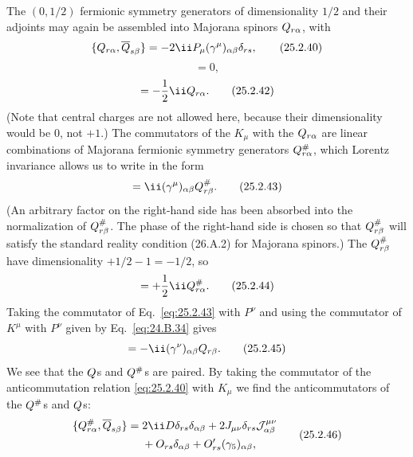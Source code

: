 The \((0,1/2)\) fermionic symmetry generators of dimensionality \(1/2\)
and their adjoints may again be assembled into Majorana spinors
\(Q_{r\alpha}\), with
\begin{equation}
\{\MajoranaQ_{r\alpha},\overline{\MajoranaQ}_{s\beta}\}
=-2\ii P_\mu(\gamma^\mu)_{\alpha\beta}\delta_{rs},
\tag{25.2.40}\label{eq:25.2.40}
\end{equation}
\begin{equation}
[P_\mu,\MajoranaQ_{r\alpha}]=0,
\tag{25.2.41}\label{eq:25.2.41}
\end{equation}
\begin{equation}
[D,\MajoranaQ_{r\alpha}]
=-\frac12\ii\MajoranaQ_{r\alpha}.
\tag{25.2.42}\label{eq:25.2.42}
\end{equation}
(Note that central charges are not allowed here, because their
dimensionality would be 0, not \(+1\).) The commutators of the \(K_\mu\)
with the \(Q_{r\alpha}\) are linear combinations of Majorana
fermionic symmetry generators \(Q^\#_{r\alpha}\), which Lorentz
invariance allows us to write in the form
\begin{equation}
[K^\mu,\MajoranaQ_{r\alpha}]
=\ii(\gamma^\mu)_{\alpha\beta}\MajoranaQ^\#_{r\beta}.
\tag{25.2.43}\label{eq:25.2.43}
\end{equation}
(An arbitrary factor on the right-hand side has been absorbed into the
normalization of \(Q^\#_{r\beta}\). The phase of the right-hand
side is chosen so that \(Q^\#_{r\beta}\) will satisfy the standard
reality condition (26.A.2) for Majorana spinors.) The
\(Q^\#_{r\beta}\) have dimensionality \(+1/2-1=-1/2\), so
\begin{equation}
[D,\MajoranaQ^\#_{r\alpha}]
=+\frac12\ii\MajoranaQ^\#_{r\alpha}.
\tag{25.2.44}\label{eq:25.2.44}
\end{equation}
Taking the commutator of Eq.~\eqref{eq:25.2.43} with \(P^\nu\) and using
the commutator of \(K^\mu\) with \(P^\nu\) given by
Eq.~\eqref{eq:24.B.34} gives
\begin{equation}
[P^\nu,\MajoranaQ^\#_{r\alpha}]
=-\ii(\gamma^\nu)_{\alpha\beta}\MajoranaQ_{r\beta}.
\tag{25.2.45}\label{eq:25.2.45}
\end{equation}
We see that the \(Q\)s and \(Q^\#\)s are paired. By
taking the commutator of the anticommutation relation \eqref{eq:25.2.40}
with \(K_\mu\) we find the anticommutators of the
\(Q^\#\)s and \(Q\)s:
\begin{equation}
\begin{aligned}
\{\MajoranaQ^\#_{r\alpha},\overline{\MajoranaQ}_{s\beta}\}
={}&2\ii D\delta_{rs}\delta_{\alpha\beta}
+2J_{\mu\nu}\delta_{rs}\mathcal J^{\mu\nu}_{\alpha\beta}
\\
&{}+O_{rs}\delta_{\alpha\beta}
+O'_{rs}(\gamma_5)_{\alpha\beta},
\end{aligned}
\tag{25.2.46}\label{eq:25.2.46}
\end{equation}
